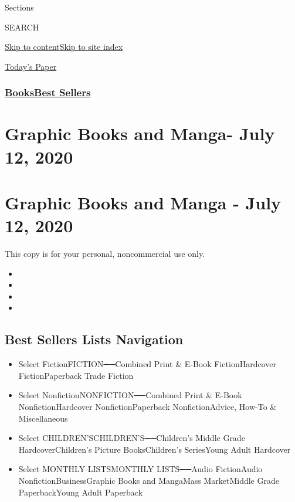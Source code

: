 Sections

SEARCH

\protect\hyperlink{site-content}{Skip to
content}\protect\hyperlink{site-index}{Skip to site index}

\href{https://myaccount.nytimes3xbfgragh.onion/auth/login?response_type=cookie\&client_id=vi}{}

\href{https://www.nytimes3xbfgragh.onion/section/todayspaper}{Today's
Paper}

\hypertarget{booksbest-sellers}{%
\subsubsection{\texorpdfstring{\href{/section/books/}{Books}\textbar{}\href{/books/best-sellers/}{Best
Sellers}}{Books\textbar{}Best Sellers}}\label{booksbest-sellers}}

\hypertarget{graphic-books-and-manga--july-12-2020}{%
\section{Graphic Books and Manga- July 12,
2020}\label{graphic-books-and-manga--july-12-2020}}

\hypertarget{graphic-books-and-manga---july-12-2020}{%
\section{Graphic Books and Manga - July 12,
2020}\label{graphic-books-and-manga---july-12-2020}}

This copy is for your personal, noncommercial use only.

\begin{itemize}
\item
\item
\item
\item
\end{itemize}

\hypertarget{best-sellers-lists-navigation}{%
\subsection{Best Sellers Lists
Navigation}\label{best-sellers-lists-navigation}}

\begin{itemize}
\tightlist
\item
  Select FictionFICTION──Combined Print \& E-Book FictionHardcover
  FictionPaperback Trade Fiction
\item
  Select NonfictionNONFICTION──Combined Print \& E-Book
  NonfictionHardcover NonfictionPaperback NonfictionAdvice, How-To \&
  Miscellaneous
\item
  Select CHILDREN'SCHILDREN'S──Children's Middle Grade
  HardcoverChildren's Picture BooksChildren's SeriesYoung Adult
  Hardcover
\item
  Select MONTHLY LISTSMONTHLY LISTS──Audio FictionAudio
  NonfictionBusinessGraphic Books and MangaMass MarketMiddle Grade
  PaperbackYoung Adult Paperback
\end{itemize}

